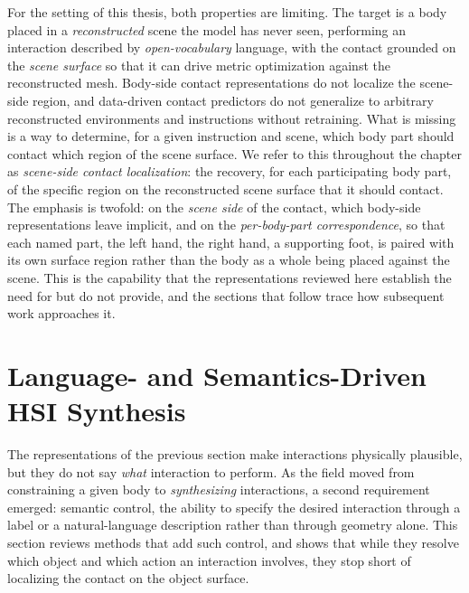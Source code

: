 For the setting of this thesis, both properties are limiting. The target is a body placed in a \emph{reconstructed} scene the model has never seen, performing an interaction described by \emph{open-vocabulary} language, with the contact grounded on the \emph{scene surface} so that it can drive metric optimization against the reconstructed mesh. Body-side contact representations do not localize the scene-side region, and data-driven contact predictors do not generalize to arbitrary reconstructed environments and instructions without retraining. What is missing is a way to determine, for a given instruction and scene, which body part should contact which region of the scene surface. We refer to this throughout the chapter as \emph{scene-side contact localization}: the recovery, for each participating body part, of the specific region on the reconstructed scene surface that it should contact. The emphasis is twofold: on the \emph{scene side} of the contact, which body-side representations leave implicit, and on the \emph{per-body-part correspondence}, so that each named part, the left hand, the right hand, a supporting foot, is paired with its own surface region rather than the body as a whole being placed against the scene. This is the capability that the representations reviewed here establish the need for but do not provide, and the sections that follow trace how subsequent work approaches it.

\section{Language- and Semantics-Driven HSI Synthesis}
\label{sec:rw-language}

The representations of the previous section make interactions physically plausible, but they do not say \emph{what} interaction to perform. As the field moved from constraining a given body to \emph{synthesizing} interactions, a second requirement emerged: semantic control, the ability to specify the desired interaction through a label or a natural-language description rather than through geometry alone. This section reviews methods that add such control, and shows that while they resolve which object and which action an interaction involves, they stop short of localizing the contact on the object surface.

